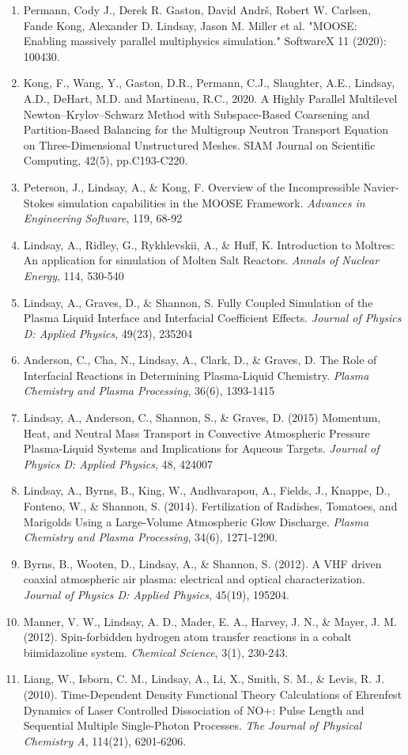 \begin{enumerate}
  \item Permann, Cody J., Derek R. Gaston, David Andrš, Robert W. Carlsen, Fande Kong, Alexander D. Lindsay, Jason M. Miller et al. "MOOSE: Enabling massively parallel multiphysics simulation." SoftwareX 11 (2020): 100430.
  \item Kong, F., Wang, Y., Gaston, D.R., Permann, C.J., Slaughter, A.E., Lindsay, A.D., DeHart, M.D. and Martineau, R.C., 2020. A Highly Parallel Multilevel Newton--Krylov--Schwarz Method with Subspace-Based Coarsening and Partition-Based Balancing for the Multigroup Neutron Transport Equation on Three-Dimensional Unstructured Meshes. SIAM Journal on Scientific Computing, 42(5), pp.C193-C220.
  \item Peterson, J., Lindsay, A., \& Kong, F. Overview of the Incompressible Navier-Stokes simulation capabilities in the MOOSE Framework. \textit{Advances in Engineering Software}, 119, 68-92
  \item Lindsay, A., Ridley, G., Rykhlevskii, A., \& Huff, K. Introduction to Moltres: An application for simulation of Molten Salt Reactors. \textit{Annals of Nuclear Energy}, 114, 530-540
  \item Lindsay, A., Graves, D., \& Shannon, S. Fully Coupled Simulation
  of the Plasma Liquid Interface and Interfacial Coefficient
  Effects. \textit{Journal of Physics D: Applied Physics}, 49(23), 235204
  \item Anderson, C., Cha, N., Lindsay, A., Clark, D., \& Graves, D. The
  Role of Interfacial Reactions in Determining Plasma-Liquid
  Chemistry. \textit{Plasma Chemistry and Plasma Processing}, 36(6), 1393-1415
  \item Lindsay, A., Anderson, C., Shannon, S., \& Graves, D. (2015) Momentum, Heat, and Neutral Mass Transport in Convective Atmospheric Pressure Plasma-Liquid Systems and Implications for Aqueous Targets. \textit{Journal of Physics D: Applied Physics}, 48, 424007
  \item Lindsay, A., Byrns, B., King, W., Andhvarapou, A., Fields, J., Knappe, D., Fonteno, W., \& Shannon, S. (2014). Fertilization of Radishes, Tomatoes, and Marigolds Using a Large-Volume Atmospheric Glow Discharge. \textit{Plasma Chemistry and Plasma Processing}, 34(6), 1271-1290.
  \item Byrns, B., Wooten, D., Lindsay, A., \& Shannon, S. (2012). A VHF driven coaxial atmospheric air plasma: electrical and optical characterization. \textit{Journal of Physics D: Applied Physics}, 45(19), 195204.
  \item Manner, V. W., Lindsay, A. D., Mader, E. A., Harvey, J. N., \& Mayer, J. M. (2012). Spin-forbidden hydrogen atom transfer reactions in a cobalt biimidazoline system. \textit{Chemical Science}, 3(1), 230-243.
  \item Liang, W., Isborn, C. M., Lindsay, A., Li, X., Smith, S. M., \& Levis,
    R. J. (2010). Time-Dependent Density Functional Theory Calculations of
    Ehrenfest Dynamics of Laser Controlled Dissociation of NO+: Pulse Length and
    Sequential Multiple Single-Photon Processes. \textit{The Journal of Physical
      Chemistry A}, 114(21), 6201-6206.
\end{enumerate}
